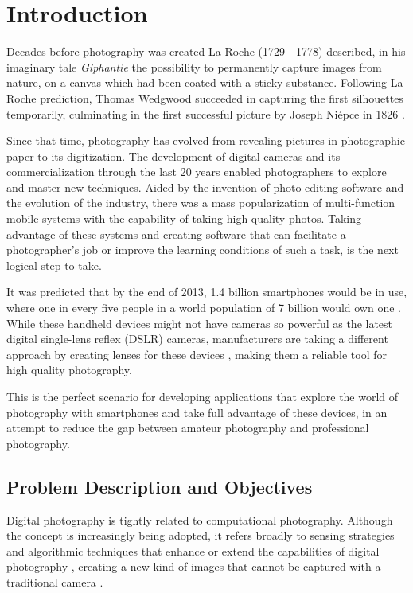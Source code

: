 \chapter{Introduction}
\label{cha:introduction}

Decades before photography was created La Roche (1729 - 1778) described, in his imaginary tale \emph{Giphantie} the possibility to permanently capture images from nature, on a canvas which had been coated with a sticky substance. Following La Roche prediction, Thomas Wedgwood succeeded in capturing the first silhouettes temporarily, culminating in the first successful picture by Joseph Niépce in 1826 \cite{lemagny1987history}. 

Since that time, photography has evolved from revealing pictures in photographic paper to its digitization. The development of digital cameras and its commercialization through the last 20 years enabled photographers to explore and master new techniques.
Aided by the invention of photo editing software and the evolution of the industry, there was a mass popularization of multi-function mobile systems with the capability of taking high quality photos. 
Taking advantage of these systems and creating software that can facilitate a photographer's job or improve the learning conditions of such a task, is the next logical step to take.

It was predicted that by the end of 2013, 1.4 billion smartphones would be in use, where one in every five people in a world population of 7 billion would own one \cite{Leonard2013}. While these handheld devices might not have cameras so powerful as the latest digital single-lens reflex (DSLR) cameras, manufacturers are taking a different approach by creating lenses for these devices \cite{Bolton2013}, making them a reliable tool for high quality photography.

This is the perfect scenario for developing applications that explore the world of photography with smartphones and take full advantage of these devices, in an attempt to reduce the gap between amateur photography and professional photography.

\section{Problem Description and Objectives}
\label{sec:problem_description}
Digital photography is tightly related to computational photography. Although the concept is increasingly being adopted, it refers broadly to sensing strategies and algorithmic techniques that enhance or extend the capabilities of digital photography \cite{szeliski2012technical}, creating a new kind of images that cannot be captured with a traditional camera \cite{pulli2009mobile}. 

